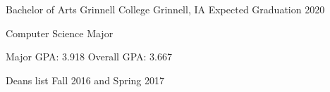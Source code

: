 \documentclass[12pt, a4paper]{awesome-cv}
\begin{document}
\makecvheader


\begin{cventries}
  \cventry
    {Bachelor of Arts}
    {Grinnell College}
    {Grinnell, IA}
    {Expected Graduation 2020}
    {
      \begin{cvitems}
	\item {Computer Science Major}
	\item {Major GPA: 3.918 \quad Overall GPA: 3.667}
        \item {Deans list Fall 2016 and Spring 2017}
      \end{cvitems}
    }
\end{cventries}
\end{document}
